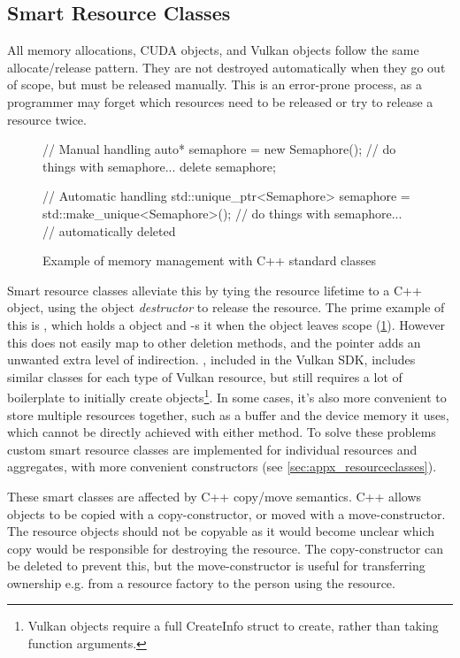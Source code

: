 \subsection{Smart Resource Classes}
All memory allocations, CUDA objects, and Vulkan objects follow the same allocate/release pattern.
They are not destroyed automatically when they go out of scope, but must be released manually.
This is an error-prone process, as a programmer may forget which resources need to be released or try to release a resource twice.

\begin{figure}
    \centering
    \begin{cppcode}
// Manual handling
{
    auto* semaphore = new Semaphore();
    // do things with semaphore...
    delete semaphore;
}

// Automatic handling
{
    std::unique_ptr<Semaphore> semaphore = std::make_unique<Semaphore>();
    // do things with semaphore...
    // automatically deleted
}
    \end{cppcode}
    \caption{Example of memory management with C++ standard classes}
    \label{fig:ImplUniquePtr}
\end{figure}

Smart resource classes alleviate this by tying the resource lifetime to a C++ object, using the object \emph{destructor} to release the resource.
The prime example of this is , which holds a  object and -s it when the object leaves scope (\cref{fig:ImplUniquePtr}).
However this does not easily map to other deletion methods, and the pointer adds an unwanted extra level of indirection.
, included in the Vulkan SDK, includes similar classes for each type of Vulkan resource, but still requires a lot of boilerplate to initially create objects\footnote{Vulkan objects require a full CreateInfo struct to create, rather than taking function arguments.}.
In some cases, it's also more convenient to store multiple resources together, such as a buffer and the device memory it uses, which cannot be directly achieved with either method.
To solve these problems custom smart resource classes are implemented for individual resources and aggregates, with more convenient constructors (see \cref{sec:appx_resourceclasses}).

These smart classes are affected by C++ copy/move semantics.
C++ allows objects to be copied with a copy-constructor, or moved with a move-constructor.
The resource objects should not be copyable as it would become unclear which copy would be responsible for destroying the resource.
The copy-constructor can be deleted to prevent this, but the move-constructor is useful for transferring ownership e.g. from a resource factory to the person using the resource.

